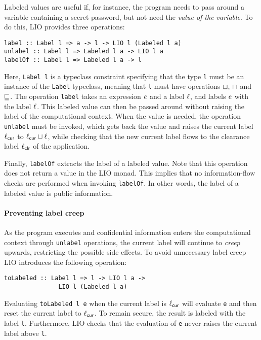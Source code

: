 Labeled values are useful if, for instance, the program needs to pass around a variable containing a secret password, but not need the \emph{value of the variable}.
To do this, LIO provides three operations:
\begin{verbatim}
label :: Label l => a -> l -> LIO l (Labeled l a)
unlabel :: Label l => Labeled l a -> LIO l a
labelOf :: Label l => Labeled l a -> l
\end{verbatim}
Here, \texttt{Label l} is a typeclass constraint specifying that the type \texttt{l} must be an instance of the \texttt{Label} typeclass, meaning that \texttt{l} must have operations $\sqcup$, $\sqcap$ and $\sqsubseteq$. The operation \texttt{label} takes an expression $e$ and a label $\ell$, and labels $e$ with the label $\ell$. This labeled value can then be passed around without raising the label of the computational context. When the value is needed, the operation \texttt{unlabel} must be invoked, which gets back the value and raises the current label $\ell_{\mathsf{cur}}$ to $\ell_{\mathsf{cur}} \sqcup \ell$, while checking that the new current label flows to the clearance label $\ell_{\mathsf{clr}}$ of the application.

Finally, \texttt{labelOf} extracts the label of a labeled value. Note that this operation does not return a value in the LIO monad. This implies that no information-flow checks are performed when invoking \texttt{labelOf}. In other words, the label of a labeled value is public information.

\paragraph{Preventing label creep}
As the program executes and confidential information enters the computational context through \texttt{unlabel} operations, the current label will continue to \emph{creep} upwards, restricting the possible side effects. To avoid unnecessary label creep LIO introduces the following operation:
\begin{verbatim}
toLabeled :: Label l => l -> LIO l a ->
               LIO l (Labeled l a)
\end{verbatim}
Evaluating \texttt{toLabeled l e} when the current label is $\ell_{\mathsf{cur}}$ will evaluate \texttt{e} and then reset the current label to $\ell_{\mathsf{cur}}$. To remain secure, the result is labeled with the label \texttt{l}. Furthermore, LIO checks that the evaluation of \texttt{e} never raises the current label above \texttt{l}.